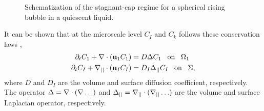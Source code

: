 \begin{figure}[h!]
    \centering
    \caption{Schematization of the stagnant-cap regime for a
    spherical rising bubble in a quiescent liquid.}
    \label{fig:contaminated_bubbles}
\end{figure}


It can be shown that at the microscale level $C_I$ and $C_k$ follows these conservation laws \citep{pesci2018computational,manikantan2020surfactant}, 
\begin{align*}
    \partial_t C_1
    + \mathbf{\nabla} \cdot (\textbf{u}_1 C_1)
    &= D \Delta C_1
    \;\;\; \text{on} \;\;\; \Omega_1\\
    \partial_t C_I
    + \mathbf{\nabla}_{||} \cdot (\textbf{u}_I C_I)
    &= D_I \Delta_{||} C_I
    \;\;\; \text{on} \;\;\; \Sigma,
\end{align*}
where $D$ and $D_I$ are the volume and surface diffusion coefficient, respectively. 
The operator $\Delta = \mathbf{\nabla} \cdot (\mathbf{\nabla}\ldots)$ and $\Delta_{||}= \mathbf{\nabla}_{||} \cdot (\mathbf{\nabla}_{||}\ldots)$ are the volume and surface Laplacian operator, respectively.

